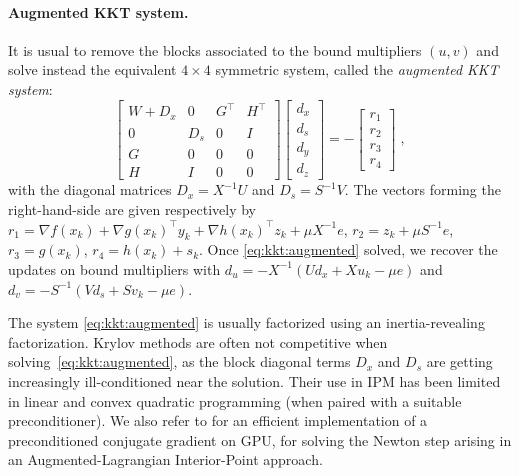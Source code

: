 \paragraph{Augmented KKT system.}
It is usual to remove the blocks associated
to the bound multipliers $(u, v)$ and solve instead the equivalent
$4 \times 4$ symmetric system, called the \emph{augmented KKT system}:
\begin{equation}
  \label{eq:kkt:augmented}
  \tag{$K_2$}
  \begin{bmatrix}
    W + D_x & 0   & G^\top           & H^\top           \\
    0       & D_s & 0\phantom{^\top} & I\phantom{^\top} \\
    G       & 0   & 0\phantom{^\top} & 0\phantom{^\top} \\
    H       & I   & 0\phantom{^\top} & 0\phantom{^\top}
  \end{bmatrix}
  \begin{bmatrix}
    d_x \\
    d_s \\
    d_y \\
    d_z
  \end{bmatrix}
  = - \begin{bmatrix}
    r_1 \\ r_2 \\ r_3 \\ r_4
  \end{bmatrix} \; ,
\end{equation}
with the diagonal matrices $D_x = X^{-1} U$ and $D_s = S^{-1} V$.
The vectors forming the right-hand-side are given respectively by
$r_1 = \nabla f(x_k) + \nabla g(x_k)^\top y_k + \nabla h(x_k)^\top z_k + \mu X^{-1} e$,
$r_2 = z_k + \mu S^{-1} e$,
$r_3 = g(x_k)$,
$r_4 = h(x_k) + s_k$.
Once \eqref{eq:kkt:augmented} solved, we recover the updates on bound multipliers with
$d_u = - X^{-1}(U d_x + X u_k - \mu e)$ and
$d_v = - S^{-1}(V d_s + S v_k - \mu e)$.

The system \eqref{eq:kkt:augmented} is usually factorized using
an inertia-revealing \lblt factorization.
Krylov methods are often not competitive when solving~\eqref{eq:kkt:augmented},
as the block diagonal terms $D_x$ and $D_s$ are getting increasingly
ill-conditioned near the solution. Their use in IPM has been limited in
linear and convex quadratic programming \cite{gondzio-2012} (when paired
with a suitable preconditioner). We also refer to \cite{cao-seth-laird-2016}
for an efficient implementation of a preconditioned conjugate gradient
on GPU, for solving the Newton step arising in an Augmented-Lagrangian Interior-Point
approach.

